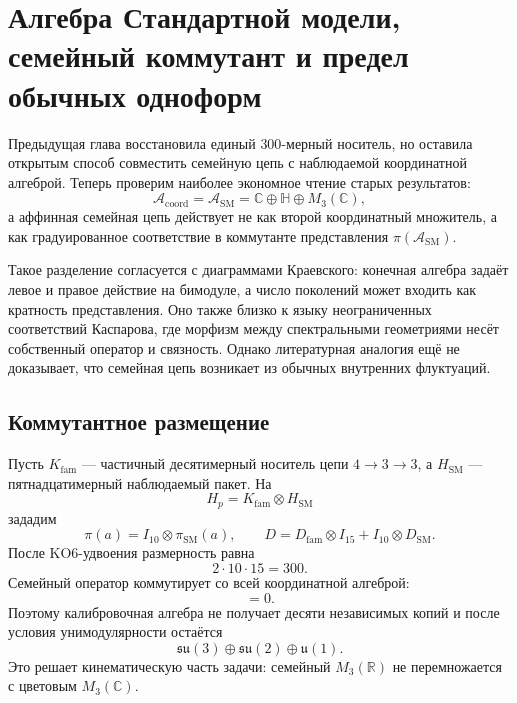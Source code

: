 \chapter{Алгебра Стандартной модели, семейный коммутант и предел обычных одноформ}

Предыдущая глава восстановила единый $300$-мерный носитель, но оставила
открытым способ совместить семейную цепь с наблюдаемой координатной алгеброй.
Теперь проверим наиболее экономное чтение старых результатов:
\begin{equation}
 \mathcal A_{\mathrm{coord}}=\mathcal A_{\mathrm{SM}}
 =\mathbb C\oplus\mathbb H\oplus M_3(\mathbb C),
 \label{eq:v5-sm-coordinate-algebra}
\end{equation}
а аффинная семейная цепь действует не как второй координатный множитель, а
как градуированное соответствие в коммутанте представления
$\pi(\mathcal A_{\mathrm{SM}})$.

Такое разделение согласуется с диаграммами Краевского: конечная алгебра
задаёт левое и правое действие на бимодуле, а число поколений может входить
как кратность представления. Оно также близко к языку неограниченных
соответствий Каспарова, где морфизм между спектральными геометриями несёт
собственный оператор и связность. Однако литературная аналогия ещё не
доказывает, что семейная цепь возникает из обычных внутренних флуктуаций.

\section{Коммутантное размещение}

Пусть $K_{\mathrm{fam}}$ --- частичный десятимерный носитель цепи
$4\to3\to3$, а $H_{\mathrm{SM}}$ --- пятнадцатимерный наблюдаемый пакет.
На
\begin{equation}
 H_p=K_{\mathrm{fam}}\otimes H_{\mathrm{SM}}
\end{equation}
зададим
\begin{equation}
 \pi(a)=I_{10}\otimes\pi_{\mathrm{SM}}(a),
 \qquad
 D=D_{\mathrm{fam}}\otimes I_{15}
   +I_{10}\otimes D_{\mathrm{SM}}.
 \label{eq:v5-sm-family-product}
\end{equation}
После KO6-удвоения размерность равна
\begin{equation}
 2\cdot10\cdot15=300.
\end{equation}
Семейный оператор коммутирует со всей координатной алгеброй:
\begin{equation}
 [D_{\mathrm{fam}}\otimes I_{15},\pi(a)]=0.
 \label{eq:v5-family-in-commutant}
\end{equation}
Поэтому калибровочная алгебра не получает десяти независимых копий и после
условия унимодулярности остаётся
\begin{equation}
 \mathfrak{su}(3)\oplus\mathfrak{su}(2)\oplus\mathfrak u(1).
\end{equation}
Это решает кинематическую часть задачи: семейный $M_3(\mathbb R)$ не
перемножается с цветовым $M_3(\mathbb C)$.

